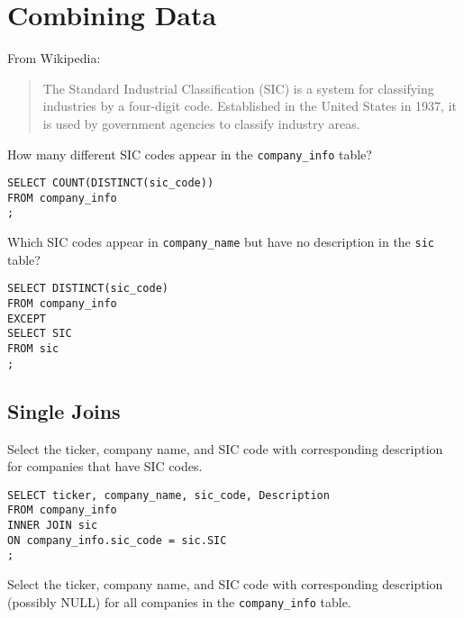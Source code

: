 \documentclass[10pt]{exam}
\begin{document}
\section{Combining Data}

From Wikipedia:

    \begin{quote}
        The Standard Industrial Classification (SIC) is a system for
        classifying industries by a four-digit code. Established in the
        United States in 1937, it is used by government agencies to
        classify industry areas.
    \end{quote}

\begin{questions}

\question How many different SIC codes appear in the \texttt{company\_info}
table?

\begin{solution}
\begin{lstlisting}
SELECT COUNT(DISTINCT(sic_code))
FROM company_info
;
\end{lstlisting}
\end{solution}

    \question Which SIC codes appear in \texttt{company\_name} but have no
    description in the \texttt{sic} table?

\begin{solution}
\begin{lstlisting}
SELECT DISTINCT(sic_code)
FROM company_info
EXCEPT
SELECT SIC
FROM sic
;
\end{lstlisting}
\end{solution}



\subsection*{Single Joins}

\question Select the ticker, company name, and SIC code with corresponding description for
    companies that have SIC codes.

\begin{solution}
\begin{lstlisting}
SELECT ticker, company_name, sic_code, Description
FROM company_info
INNER JOIN sic
ON company_info.sic_code = sic.SIC
;
\end{lstlisting}
\end{solution}


\question Select the ticker, company name, and SIC code with corresponding
    description (possibly NULL) for
    all companies in the \texttt{company\_info} table. 


\end{questions}
\end{document}
